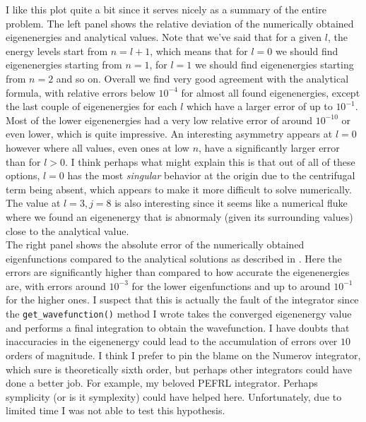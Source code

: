 \documentclass[10pt, titlepage, a4paper]{article}
\begin{document}
I like this plot quite a bit since it serves nicely as a summary of the entire problem. The left panel shows the relative deviation of the numerically obtained eigenenergies and analytical values. Note that we've 
said that for a given $l$, the energy levels start from $n = l + 1$, which means that for $l = 0$ we should find eigenenergies starting from $n = 1$, for $l = 1$ we should find eigenenergies starting from $n = 2$ and so on.
Overall we find very good agreement with the analytical formula, with relative errors below $10^{-4}$ for almost all found eigenenergies, except the last couple of eigenenergies for each $l$ which have a larger error of up to $10^{-1}$.
Most of the lower eigenenergies had a very low relative error of around $10^{-10}$ or even lower, which is quite impressive. An interesting asymmetry appears at $l=0$ however where 
all values, even ones at low $n$, have a significantly larger error than for $l > 0$. I think perhaps what might explain this is that out of all of these options, $l = 0$ has the most \textit{singular} behavior at the origin 
due to the centrifugal term being absent, which appears to make it more difficult to solve numerically. The value at $l=3, j=8$ is also interesting since it seems like a numerical fluke where we found an eigenenergy that is abnormaly 
(given its surrounding values) close to the analytical value. \\

The right panel shows the absolute error of the numerically obtained eigenfunctions compared to the analytical solutions as described in . Here the errors are significantly 
higher than compared to how accurate the eigenenergies are, with errors around $10^{-3}$ for the lower eigenfunctions and up to around $10^{-1}$ for the higher ones. I suspect that this is 
actually the fault of the integrator since the \texttt{get\_wavefunction()} method I wrote takes the converged eigenenergy value and performs a final integration to obtain the wavefunction. I have 
doubts that inaccuracies in the eigenenergy could lead to the accumulation of errors over $10$ orders of magnitude. I think I prefer to pin the blame on the Numerov integrator, which sure is theoretically 
sixth order, but perhaps other integrators could have done a better job. For example, my beloved PEFRL integrator. Perhaps symplicity (or is it symplexity) could have helped here. Unfortunately, due to limited 
time I was not able to test this hypothesis. \\
\end{document}
